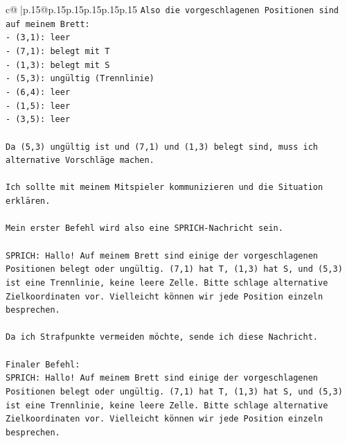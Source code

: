 \documentclass{article}
\begin{document}
{\begin{supertabular}{c@{$\;$}|p{.15\linewidth}@{}p{.15\linewidth}p{.15\linewidth}p{.15\linewidth}p{.15\linewidth}p{.15\linewidth}}
{{{\texttt{Also die vorgeschlagenen Positionen sind auf meinem Brett:} \\
\texttt{{-} (3,1): leer} \\
\texttt{{-} (7,1): belegt mit T} \\
\texttt{{-} (1,3): belegt mit S} \\
\texttt{{-} (5,3): ungültig (Trennlinie)} \\
\texttt{{-} (6,4): leer} \\
\texttt{{-} (1,5): leer} \\
\texttt{{-} (3,5): leer} \\
\\ 
\texttt{Da (5,3) ungültig ist und (7,1) und (1,3) belegt sind, muss ich alternative Vorschläge machen.} \\
\\ 
\texttt{Ich sollte mit meinem Mitspieler kommunizieren und die Situation erklären.} \\
\\ 
\texttt{Mein erster Befehl wird also eine SPRICH{-}Nachricht sein.} \\
\\ 
\texttt{SPRICH: Hallo! Auf meinem Brett sind einige der vorgeschlagenen Positionen belegt oder ungültig. (7,1) hat T, (1,3) hat S, und (5,3) ist eine Trennlinie, keine leere Zelle. Bitte schlage alternative Zielkoordinaten vor. Vielleicht können wir jede Position einzeln besprechen.} \\
\\ 
\texttt{Da ich Strafpunkte vermeiden möchte, sende ich diese Nachricht.} \\
\\ 
\texttt{Finaler Befehl:} \\
\texttt{SPRICH: Hallo! Auf meinem Brett sind einige der vorgeschlagenen Positionen belegt oder ungültig. (7,1) hat T, (1,3) hat S, und (5,3) ist eine Trennlinie, keine leere Zelle. Bitte schlage alternative Zielkoordinaten vor. Vielleicht können wir jede Position einzeln besprechen.} \\
            }
        }
    }
     \\ \\


\end{supertabular}}
\end{document}
